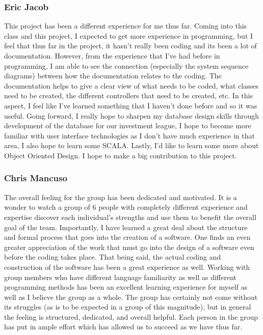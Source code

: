 \subsubsection{Eric Jacob}
This project has been a different experience for me thus far.  Coming into this
class and this project, I expected to get more experience in programming, but I
feel that thus far in the project, it hasn't really been coding and its been a
lot of documentation.  However, from the experience that I've had before in
programming, I am able to see the connection (especially the system sequence
diagrams) between how the documentation relates to the coding.  The
documentation helps to give a clear view of what needs to be coded, what classes
need to be created, the different controllers that need to be created, etc.  In
this aspect, I feel like I've learned something that I haven't done before and
so it was useful.  Going forward, I really hope to sharpen my database design
skills through development of the database for our investment league, I hope to
become more familiar with user interface technologies as I don't have much
experience in that area, I also hope to learn some SCALA.  Lastly, I'd like to
learn some more about Object Oriented Design.  I hope to make a big contribution
to this project.

\subsubsection{Chris Mancuso}
The overall feeling for the group has been dedicated and motivated. It is a
wonder to watch a group of 6 people with completely different experience and
expertise discover each individual's strengths and use them to benefit the
overall goal of the team. Importantly, I have learned a great deal about the
structure and formal process that goes into the creation of a software. One
finds an even greater appreciation of the work that must go into the design of
a software even before the coding takes place. That being said, the actual
coding and construction of the software has been a great experience as well.
Working with group members who have different language familiarity as well as
different programming methods has been an excellent learning experience for
myself as well as I believe the group as a whole. The group has certainly not
come without its struggles (as is to be expected in a group of this magnitude),
but in general the feeling is structured, dedicated, and overall helpful. Each
person in the group has put in ample effort which has allowed us to succeed as
we have thus far.


